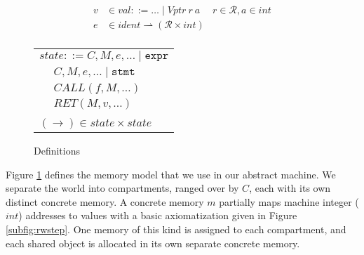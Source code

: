 \documentclass{article}
\begin{document}
\begin{figure}
\begin{minipage}[t]{0.49\textwidth}
\[\begin{aligned}
    v & \in \mathit{val} ::= \ldots \mid \mathit{Vptr} ~ r ~ a &
    r \in \mathcal{R}, a \in \mathit{int} \\
    e & \in \mathit{ident} \rightharpoonup (\mathcal{R} \times \mathit{int}) \\
    \end{aligned}\]
    \begin{tabular}{l | l}
      \multicolumn{2}{r}{\(\mathit{state} ::= C, M, e, \ldots \mid \mathtt{expr}\)} \\
      \hspace{4em} & \(C, M, e, \ldots \mid \mathtt{stmt}\) \\
      \hspace{4em} & \(\mathit{CALL}(f, M, \ldots)\)  \\
      \hspace{4em} & \(\mathit{RET}(M, v, \ldots)\) \\
      \multicolumn{2}{l}{} \\
      \multicolumn{2}{l}{\hspace{1.5em}\((\longrightarrow) \in
        \mathit{state} \times \mathit{state}\)} \\
    \end{tabular}
  \end{minipage}

  \caption{Definitions}
  \label{fig:memmod}
\end{figure}

Figure \ref{fig:memmod} defines the memory model that we use in our abstract machine.
We separate the world into compartments, ranged over by \(C\), each with its own distinct
concrete memory. A concrete memory \(m\) partially maps machine
integer (\(\mathit{int}\)) addresses to values with a basic axiomatization given in
Figure \ref{subfig:rwstep}. One memory of this kind is assigned to each compartment, and
each shared object is allocated in its own separate concrete memory.
\end{document}

